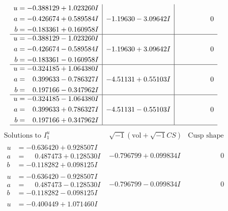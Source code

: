\documentclass[1p]{elsarticle_modified}
\theoremstyle{definition}
\newcommand{\I}{\sqrt{-1}}
\begin{document}
$$\begin{array}{c|c|c}
\begin{aligned}
u &= -0.388129 + 1.023260 I \\
a &= -0.426674 + 0.589584 I \\
b &= -0.183361 + 0.160958 I\end{aligned}
 & -1.19630 - 3.09642 I & \phantom{-0.000000 } 0 \\ \hline\begin{aligned}
u &= -0.388129 - 1.023260 I \\
a &= -0.426674 - 0.589584 I \\
b &= -0.183361 - 0.160958 I\end{aligned}
 & -1.19630 + 3.09642 I & \phantom{-0.000000 } 0 \\ \hline\begin{aligned}
u &= -0.324185 + 1.064380 I \\
a &= \phantom{-}0.399633 - 0.786327 I \\
b &= \phantom{-}0.197166 - 0.347962 I\end{aligned}
 & -4.51131 + 0.55103 I & \phantom{-0.000000 } 0 \\ \hline\begin{aligned}
u &= -0.324185 - 1.064380 I \\
a &= \phantom{-}0.399633 + 0.786327 I \\
b &= \phantom{-}0.197166 + 0.347962 I\end{aligned}
 & -4.51131 - 0.55103 I & \phantom{-0.000000 } 0\\
 \hline 
 \end{array}$$\newpage$$\begin{array}{c|c|c}  
\text{Solutions to }I^u_{1}& \I (\text{vol} + \sqrt{-1}CS) & \text{Cusp shape}\\
 \hline 
\begin{aligned}
u &= -0.636420 + 0.928507 I \\
a &= \phantom{-}0.487473 + 0.128530 I \\
b &= -0.118282 + 0.098125 I\end{aligned}
 & -0.796799 + 0.099834 I & \phantom{-0.000000 } 0 \\ \hline\begin{aligned}
u &= -0.636420 - 0.928507 I \\
a &= \phantom{-}0.487473 - 0.128530 I \\
b &= -0.118282 - 0.098125 I\end{aligned}
 & -0.796799 - 0.099834 I & \phantom{-0.000000 } 0 \\ \hline\begin{aligned}
u &= -0.400449 + 1.071460 I \\

\end{aligned}
\end{array}$$
\end{document}
